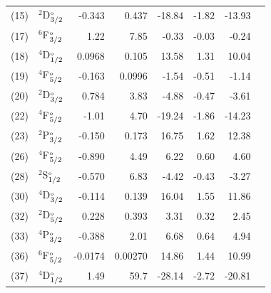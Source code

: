 \documentclass[10pt,a4paper, twoside, openright]{report}
\begin{document}
\begin{table}[t!]
\begin{tabular}{cl@{\hspace{0.75cm}}r@{\hspace{0.75cm}}r@{\hspace{0.75cm}}r@{\hspace{0.5cm}}r@{\hspace{0.5cm}}r@{\hspace{0.5cm}}r}
 (15) & $^2$D$^{\rm_o}_{3/2}$  &   -0.343  & 0.437 & -18.84 & -1.82 & -13.93   \\
(17)  & $^6$F$^{\rm_o}_{3/2}$  &    1.22  & 7.85 & -0.33 & -0.03 & -0.24 \\
 (18) & $^4$D$^{\rm_o}_{1/2}$  &    0.0968 & 0.105 & 13.58 & 1.31 & 10.04 \\
 (19) & $^4$F$^{\rm_o}_{5/2}$ &    -0.163 & 0.0996& -1.54 & -0.51 & -1.14 \\
 (20) & $^2$D$^{\rm_o}_{3/2}$  &    0.784 & 3.83 & -4.88 & -0.47 & -3.61 \\
 (22) & $^4$F$^{\rm_o}_{5/2}$  &    -1.01 & 4.70  & -19.24 & -1.86 & -14.23 \\
 (23)  & $^2$P$^{\rm_o}_{3/2}$  &   -0.150 & 0.173 & 16.75 & 1.62 & 12.38 \\
 (26) & $^4$F$^{\rm_o}_{5/2}$  &    -0.890 & 4.49  & 6.22 & 0.60 & 4.60 \\
 (28) & $^2$S$^{\rm_o}_{1/2}$ &     -0.570 & 6.83 & -4.42 & -0.43 & -3.27 \\
 (30) & $^4$D$^{\rm_o}_{3/2}$ &   -0.114 & 0.139 & 16.04 & 1.55 & 11.86  \\
 (32) & $^2$D$^{\rm_o}_{5/2}$ &  0.228 & 0.393 & 3.31 & 0.32 & 2.45 \\
 (33)  & $^4$P$^{\rm_o}_{3/2}$ &   -0.388 & 2.01 & 6.68 &  0.64 & 4.94 \\
 (36) & $^6$F$^{\rm_o}_{5/2}$ &    -0.0174   & 0.00270 & 14.86 & 1.44 & 10.99 \\
 (37)  & $^4$D$^{\rm_o}_{1/2}$  &   1.49 & 59.7 & -28.14 & -2.72 & -20.81 \\
\bottomrule
\bottomrule
\end{tabular}
\end{table}
\end{document}
